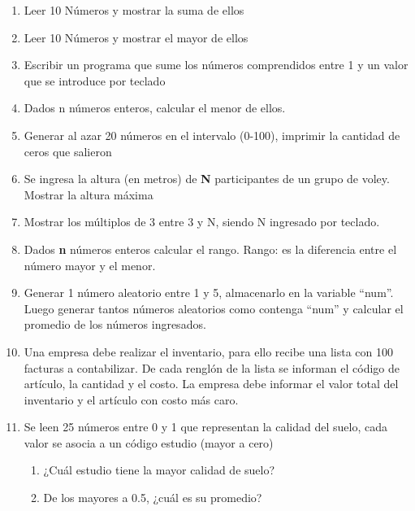  \begin{enumerate}[resume]

   \item Leer 10 Números y mostrar la suma de ellos
   
   \item Leer 10 Números y mostrar el mayor de ellos
   
   \item Escribir un programa que sume los números comprendidos entre 1 y un valor que se introduce por teclado
   
   \item Dados n números enteros, calcular el menor de ellos.
   
   \item Generar al azar 20 números en el intervalo (0-100), imprimir la cantidad de ceros que salieron
   
   \item Se ingresa la altura (en metros) de \textbf{N} participantes de un grupo de voley. Mostrar la altura máxima
   
   \item Mostrar los múltiplos de 3 entre 3 y N, siendo N ingresado por teclado.
   
   \item Dados \textbf{n} números enteros calcular el rango. Rango: es la diferencia entre el número mayor y el menor.
   
   \item Generar 1 número aleatorio entre 1 y 5, almacenarlo en la variable
    “num”. Luego generar tantos números aleatorios como contenga “num” y
    calcular el promedio de los números ingresados.

   \item Una empresa debe realizar el inventario, para ello recibe una lista con 100 facturas a contabilizar. De cada renglón de la lista se informan el código de artículo, la cantidad y el costo. La empresa debe informar el valor total del inventario y el artículo con costo más caro.

   \item Se leen 25 números entre 0 y 1 que representan la calidad del suelo, cada valor se asocia a un código estudio (mayor a cero)
   \begin{enumerate}   
         \item ¿Cuál estudio tiene la mayor calidad de suelo?
         \item De los mayores a 0.5, ¿cuál es su promedio?
   \end{enumerate}
   

\end{enumerate}
